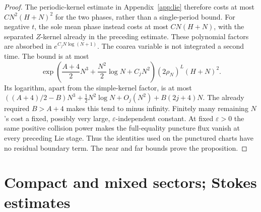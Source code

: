 \documentclass[11pt]{article}
\numberwithin{equation}{section}
\theoremstyle{definition}
\newcommand{\eps}{\varepsilon}
\begin{document}
\begin{proof}
The periodic-kernel estimate in Appendix~\ref{app:lie} therefore
costs at most \(CN^2(H+N)^2\) for the two phases, rather than a
single-period bound. For negative \(t\), the sole mean phase
instead costs at most \(CN(H+N)\), with the separated \(Z\)-kernel
already in the preceding estimate. These polynomial factors are
absorbed in \(e^{C_jN\log(N+1)}\). The coarea variable is not
integrated a second time. The bound is at most
\[
 \exp\left(\frac{A+4}{2}N^3+\frac{N^2}{2}\log N+C_jN^2\right)
 (2\rho_N)^L(H+N)^2.
\]
Its logarithm, apart from the simple-kernel factor, is at most
\(((A+4)/2-B)N^3+\tfrac12N^2\log N+O_j(N^2)+B(2j+4)N\).
The already required \(B>A+4\) makes this tend to minus infinity.
Finitely many remaining \(N\)'s cost a fixed, possibly very large,
\(\eps\)-independent constant.
At fixed \(\eps>0\) the same positive collision power makes the
full-equality puncture flux vanish at every preceding Lie stage.
Thus the identities used on the punctured charts have no residual
boundary term. The near and far bounds prove the proposition.
\end{proof}



\section{Compact and mixed sectors; Stokes estimates}
\label{sec:sectors}
\end{document}
